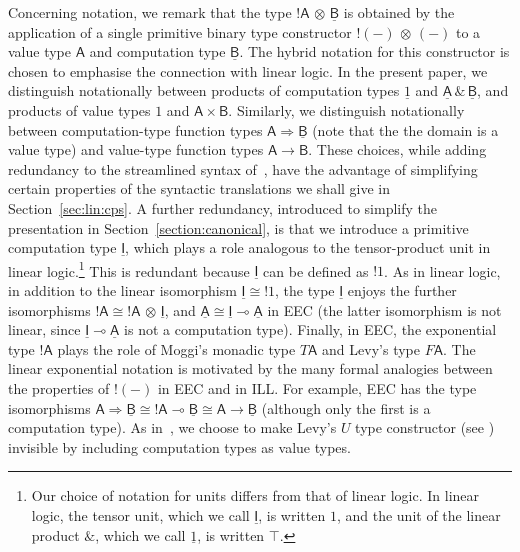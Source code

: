 \documentclass{LMCS}
\newcommand{\comptype}[1]{\underline{#1}}
\newcommand{\VA}{\mathsf{A}}
\newcommand{\VB}{\mathsf{B}}
\newcommand{\CA}{\comptype{\mathsf{A}}}
\newcommand{\CB}{\comptype{\mathsf{B}}}
\newcommand{\CI}{\comptype{\mathsf{I}}}
\newcommand{\Vone}{1}
\newcommand{\Vprod}{\times}
\newcommand{\Vfun}{\to}
\newcommand{\lpop}{\multimap}
\newcommand{\Cone}{\comptype{1}}
\newcommand{\Cprod}{\,\&\,}
\newcommand{\Cfun}{\Rightarrow}
\newcommand{\Cbang}[1]{{! #1}}
\newcommand{\Ccopower}[2]{! #1 \, {\otimes} \, #2}
\newcommand{\bang}[1]{{! #1}}
\begin{document}
Concerning notation, 
we remark that the type $\Ccopower{\VA}{\CB}$ is obtained by the application
of a single primitive binary type constructor $\Ccopower{(-)}{(-)}$ to a value type $\VA$ and 
computation type $\CB$. The hybrid notation for this constructor is chosen to emphasise the connection
with linear logic. 
In the present paper, we distinguish notationally
between products of computation types $\Cone$ and $\CA \Cprod \CB$, and products of value
types $\Vone$ and $\VA \Vprod \VB$. Similarly, we distinguish notationally between
computation-type function types $\VA \Cfun \CB$ 
(note that the the domain is a value type) and value-type function types
$\VA \Vfun \VB$. These choices, while adding redundancy to the streamlined syntax of~\cite{EMS,EMSb},
have the advantage of  simplifying certain properties of the syntactic 
translations we shall give in Section~\ref{sec:lin:cps}.
A further redundancy, introduced to simplify the presentation in Section~\ref{section:canonical},
is that we introduce a primitive computation type $\CI$, which plays a role analogous
to the tensor-product unit in linear logic.\footnote{Our choice of notation for units differs from
that of linear logic. In linear logic, the tensor unit, which we call $\CI$,  is written $1$,
and the  unit of the linear product $\&$, which we call $\Cone$, is written $\top$.}
This is redundant because $\CI$ can be defined as $\Cbang{\Vone}$.
As in linear logic, in addition to the linear isomorphism 
$\CI \cong {\Cbang{\Vone}}$, the type $\CI$ enjoys the further
isomorphisms $\Cbang{\VA} \cong {\Ccopower{\VA}{\CI}}$, and
$\CA \cong \CI \lpop \CA$ in EEC
(the latter isomorphism is not linear, since $\CI \lpop \CA$ is not a computation
type).
Finally, 
in EEC, the exponential type $\bang{\VA}$ plays the role of 
Moggi's monadic type $T \VA$ and Levy's type $F \VA$. The linear exponential
notation is motivated by the many formal analogies between the properties of $\bang{(-)}$
in EEC and in ILL. For example, EEC has the type isomorphisms
$\VA \Cfun \CB \cong \Cbang{\VA} \lpop \CB \cong  \VA \Vfun \CB$ (although only
the first is a computation type).
As in~\cite{EMS,EMSb},
we choose to make  
Levy's $U$ type constructor (see \cite{Levy:book}) invisible by including
computation types as value types. 
\end{document}
